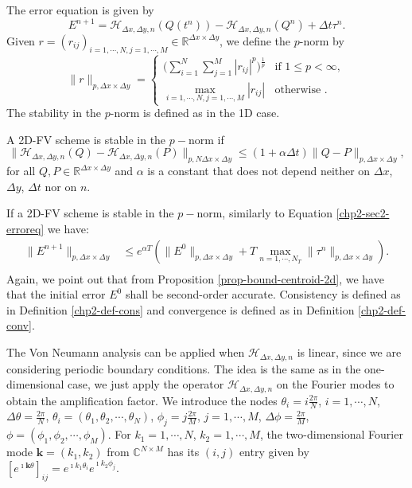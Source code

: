 The error equation is given by
\begin{equation}
	E^{n+1} = \mathcal{H}_{\Delta x ,\Delta y,n}(Q(t^n)) - \mathcal{H}_{\Delta x ,\Delta y,n}(Q^n) +  \Delta t \tau^n.
\end{equation}
Given $r = (r_{ij})_{i=1,\cdots,N,j=1,\cdots,M}\in \mathbb{R}^{\Delta x \times \Delta y}$, we define the $p$-norm by
\begin{equation}
	\label{chp3-pnorm}
	\|r\|_{p,\Delta x \times \Delta y}=
	\begin{cases}
		\bigg( \sum_{i=1}^{N} \sum_{j=1}^{M}|r_{ij}|^p \bigg)^{\frac{1}{p}} & \text{if } 1\leq p < \infty,\\
		\max_{i=1, \cdots, N,j=1,\cdots,M}{|r_{ij}|} & \text{otherwise }.
	\end{cases}
\end{equation}
The stability in the $p$-norm is defined as in the 1D case.
\begin{definition}
	A 2D-FV scheme is stable in the $p-$norm if 
	\begin{equation}
		\|\mathcal{H}_{\Delta x ,\Delta y,n}(Q) - \mathcal{H}_{\Delta x ,\Delta y,n}(P)\|_{p,N\Delta x \times \Delta y} \leq (1+\alpha \Delta t)  \|Q-P\|_{p,\Delta x \times \Delta y},
	\end{equation}
	for all $Q, P \in \mathbb{R}^{\Delta x \times \Delta y}$ and $\alpha$ is a constant
	that does not depend neither on $\Delta x$, $\Delta y$, $\Delta t$ nor on $n$.
\end{definition}
If a 2D-FV scheme is stable in the $p-$norm, similarly to Equation \eqref{chp2-sec2-erroreq} we have:
\begin{align*}
		\|E^{n+1}\|_{p,\Delta x \times \Delta y} &\leq e^{\alpha T}(\|E^0\|_{p,\Delta x \times \Delta y} + T\max_{n=1, \cdots, N_T}\|\tau^n\|_{p,\Delta x \times \Delta y}).\\
\end{align*}
Again, we point out that from Proposition \ref{prop-bound-centroid-2d}, we have that the initial error $E^0$ shall be second-order accurate.
Consistency is defined as in Definition \ref{chp2-def-cons} and convergence is defined as in Definition \ref{chp2-def-conv}.

The Von Neumann analysis can be applied when $\mathcal{H}_{\Delta x ,\Delta y,n}$ is linear, since we are considering periodic boundary conditions.
The idea is the same as in the one-dimensional case, we just apply the operator $\mathcal{H}_{\Delta x ,\Delta y,n}$ on the Fourier modes to obtain
the amplification factor.
We introduce the nodes $\theta_i = i\frac{2\pi}{N}$, $i=1, \cdots, N$, $\Delta \theta = \frac{2\pi}{N}$,
$\theta_i = (\theta_1, \theta_2, \cdots, \theta_N)$, $\phi_j = j\frac{2\pi}{M}$, $j=1, \cdots, M$, $\Delta \phi = \frac{2\pi}{M}$,
$\phi = (\phi_1, \phi_2, \cdots, \phi_M)$.
For $k_1=1, \cdots, N$, $k_2=1, \cdots, M$, the two-dimensional Fourier mode $\boldsymbol{k} = (k_1,k_2)$ from $\mathbb{C}^{N\times M}$ 
has its $(i,j)$ entry given by $[e^{\imath \boldsymbol{k} \theta}]_{ij} = e^{\imath k_1 \theta_i}e^{\imath k_2 \phi_j}$. 


